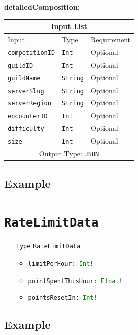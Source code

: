 \documentclass[10pt, a4paper]{memoir}
\numberwithin{equation}{section}
\theoremstyle{plain}
\theoremstyle{defp}
\theoremstyle{dotless}
\theoremstyle{definition}
\theoremstyle{dotless}
\theoremstyle{dotless}
\theoremstyle{defp}
\theoremstyle{defp}
\theoremstyle{be}          %
\theoremstyle{defp}
\newcommand\ttt[1]{\texttt{#1}}
\newcommand\type[1]{\ttt{\textcolor{green}{#1}}}
\begin{document}
\medskip

\textbf{detailedComposition:}

\begin{table}[h!]
	\centering
	\begin{tabular}{ |p{4.2cm}|p{6cm}|p{3cm}|  }
		\hline
		\multicolumn{3}{|c|}{Input List} \\
		\hline
		Input & Type & Requirement\\
		\hline
		\ttt{competitionID} & \ttt{Int} & Optional\\
		\ttt{guildID} & \ttt{Int} & Optional\\
		\ttt{guildName} & \ttt{String} & Optional\\
		\ttt{serverSlug} & \ttt{String} & Optional\\
		\ttt{serverRegion} & \ttt{String} & Optional\\
		\ttt{encounterID} & \ttt{Int} & Optional\\
		\ttt{difficulty} & \ttt{Int} & Optional\\
		\ttt{size} & \ttt{Int} & Optional\\
		\hline
		\multicolumn{3}{|c|}{Output Type: \ttt{JSON}} \\
		\hline
	\end{tabular}
\end{table}

\subsection{Example}

\newpage




\section{\ttt{RateLimitData}}\label{sec:RateLimitData}

\begin{itemize}[noitemsep,topsep=1pt]
\item[\ttt{Type}] \ttt{RateLimitData}
\begin{itemize}[itemsep=1pt,topsep=1pt]
\item \ttt{limitPerHour: \type{Int}!}
\item \ttt{pointSpentThisHour: \type{Float}!}
\item \ttt{pointsResetIn: \type{Int}!}
\end{itemize}
\end{itemize}

\subsection{Example}
\end{document}
